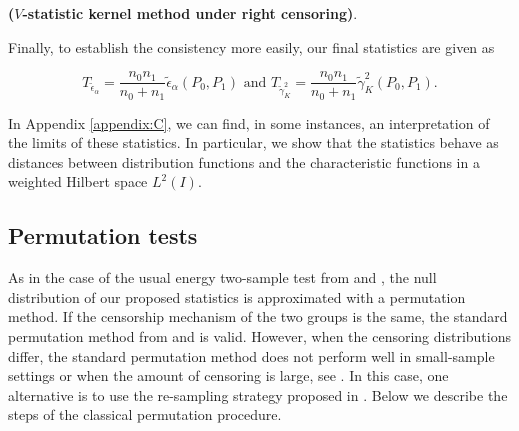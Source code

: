 \documentclass[11pt]{article}
\begin{document}
\textbf{($V$-statistic kernel method under right censoring)}.




Finally, to establish the consistency more easily, our final statistics are given as






\begin{equation}
T_{\tilde{\epsilon}_\alpha}= \frac{n_0n_1}{n_0+n_1} \tilde{\epsilon}_{\alpha}(P_0,P_1) \text{   and   }    T_{\tilde{\gamma}_K^{2}}= \frac{n_0n_1}{n_0+n_1} \tilde{\gamma}_K^{2}(P_0,P_1). 
\end{equation}




In Appendix \ref{appendix:C}, we can find,  in some instances, an interpretation of the limits of these statistics. In particular, we show that the statistics behave as distances between  distribution functions and the  characteristic functions  in a weighted Hilbert space $L^{2}(I)$.

\subsection{Permutation tests}


As in the case of  the usual energy  two-sample test from  \cite{szekely2003statistics}  and \cite{szekely2013energy},
 the null distribution of  our proposed statistics is approximated with a  permutation method. If the censorship mechanism  of the two groups is the same,  the standard permutation method    from \cite{neuhaus1993conditional} and  \cite{wang2010testing} is valid. However, when the censoring distributions differ, the standard permutation method does not perform well in small-sample settings or when the amount of censoring is large, see \cite{heimann1998permutational}. In this case, one alternative is to use the re-sampling strategy proposed in  \cite{wang2010testing}. Below we describe the steps of the classical permutation procedure.
\end{document}
